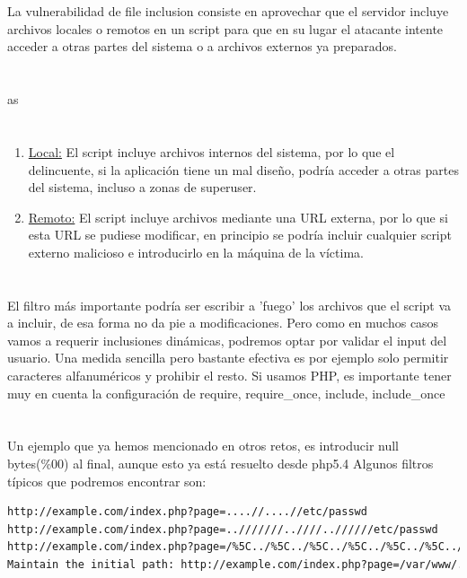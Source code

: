 \documentclass[12pt,a4paper,oneside,onecolumn]{article}
\begin{document}
 
    \section{}
    La vulnerabilidad de file inclusion consiste en aprovechar que el servidor incluye archivos locales o remotos en un script para que en su lugar el atacante intente acceder a otras partes del sistema o a archivos externos ya preparados.
    \section{}
    as
    \section{}
    \begin{enumerate}[]
        \item
        \underline {Local:} El script incluye archivos internos del sistema, por lo que el delincuente, si la aplicaci\'on tiene un mal dise\~no, podr\'ia acceder a otras partes del sistema, incluso a zonas de superuser.
        \item
        \underline {Remoto:} El script incluye archivos mediante una URL externa, por lo que si esta URL se pudiese modificar, en principio se podr\'ia incluir cualquier script externo malicioso e introducirlo en la m\'aquina de la v\'ictima.
    \end{enumerate}
    \section{}
    El filtro m\'as importante podr\'ia ser escribir a 'fuego' los archivos que el script va a incluir, de esa forma no da pie a modificaciones. Pero como en muchos casos vamos a requerir inclusiones din\'amicas, podremos optar por validar el input del usuario.
    Una medida sencilla pero bastante efectiva es por ejemplo solo permitir caracteres alfanum\'ericos y prohibir el resto.
    Si usamos PHP, es importante tener muy en cuenta la configuraci\'on de require, require\_once, include, include\_once
    \section{}
    Un ejemplo que ya hemos mencionado en otros retos, es introducir null bytes(\%00) al final, aunque esto ya est\'a resuelto desde php5.4
    Algunos filtros t\'ipicos que podremos encontrar son:
    \begin{lstlisting}[language = html]
http://example.com/index.php?page=....//....//etc/passwd
http://example.com/index.php?page=..///////..////..//////etc/passwd
http://example.com/index.php?page=/%5C../%5C../%5C../%5C../%5C../%5C../%5C../%5C../%5C../%5C../%5C../etc/passwd
Maintain the initial path: http://example.com/index.php?page=/var/www/../../etc/passwd
    \end{lstlisting}
    
\end{document}
